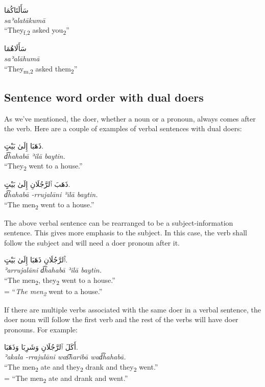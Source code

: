 \documentclass[
  10pt,
]{book}
\begin{document}
\foreignlanguage{arabic}{سَأَلَتَاکُمَا}\\
\emph{saʾalatākumā}\\
\enquote{They\textsubscript{f,2} asked you\textsubscript{2}}

\foreignlanguage{arabic}{سَأَلَاهُمَا}\\
\emph{saʾalāhumā}\\
\enquote{They\textsubscript{m,2} asked them\textsubscript{2}}

\subsection{Sentence word order with dual doers}\label{sentence-word-order-with-dual-doers}

As we've mentioned, the doer, whether a noun or a pronoun, always comes after the verb. Here are a couple of examples of verbal sentences with dual doers:

\foreignlanguage{arabic}{ذَهَبَا إِلَىٰ بَيْتٍ.}\\
\emph{d͡hahabā ʾilā baytin.}\\
\enquote{They\textsubscript{2} went to a house.}

\foreignlanguage{arabic}{ذَهَبَ ٱلرَّجُلَانِ إِلَىٰ بَيْتٍ.}\\
\emph{d͡hahabā -rrujalāni ʾilā baytin.}\\
\enquote{The men\textsubscript{2} went to a house.}

The above verbal sentence can be rearranged to be a subject-information sentence. This gives more emphasis to the subject. In this case, the verb shall follow the subject and will need a doer pronoun after it.

\foreignlanguage{arabic}{ٱَلرَّجُلَانِ ذَهَبَا إِلَىٰ بَيْتٍ.}\\
\emph{ʾarrujalāni d͡hahabā ʾilā baytin.}\\
\enquote{The men\textsubscript{2}, they\textsubscript{2} went to a house.}\\
= \enquote{\emph{The men\textsubscript{2}} went to a house.}

If there are multiple verbs associated with the same doer in a verbal sentence, the doer noun will follow the first verb and the rest of the verbs will have doer pronouns. For example:

\foreignlanguage{arabic}{أَکَلَ ٱلرَّجُلَانِ وَشَرِبَا وَذَهَبَا.}\\
\emph{ʾakala -rrajulāni was͡haribā wad͡hahabā.}\\
\enquote{The men\textsubscript{2} ate and they\textsubscript{2} drank and they\textsubscript{2} went.}\\
= \enquote{The men\textsubscript{2} ate and drank and went.}
\end{document}
